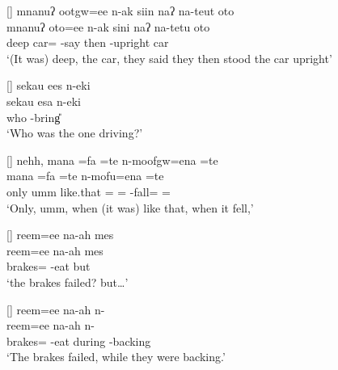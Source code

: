 \begin{exe}
{\begin{xlist}
	
\end{xlist}}

[]{
	\glll	mnanuʔ ootgw=ee n-ak siin naʔ na-teut oto\\
				mnanuʔ oto=ee n-ak sini naʔ na-tetu oto \\
				deep car={\ee} \n-say {\siin} then \nat-upright car \\
	\glt	`(It was) deep, the car, they said they then stood the car upright'}

[]{\glll
	sekau ees n-eki\\
	sekau esa n-eki\\
	who {\esc} \n-bring{\U} \\
\glt `Who was the one driving?'}

\vspace{-4pt}
[]{\glll
	 nehh, mana =fa =te n-moofgw=ena =te\\
	 {} mana =fa =te n-mofu=ena =te \\
	only umm like.that ={\fa} ={\te} \n-fall={\een} ={\te} \\
\glt `Only, umm, when (it was) like that, when it fell,'}

[]{\glll
	reem=ee na-ah mes \\
	reem=ee na-ah mes\\
	brakes={\ee} \na-eat but\\
\glt `the brakes failed? but{\ldots}'}

[]{\glll
	reem=ee na-ah  n- \\
	reem=ee na-ah  n- \\
	brakes={\ee} \na-eat during \n-backing \\
\glt `The brakes failed, while they were backing.' }


\end{exe}
